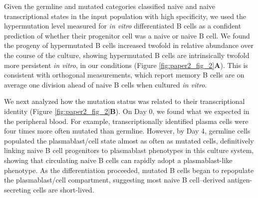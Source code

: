 Given the germline and mutated categories classified naive and naive transcriptional states in the input population with high specificity, we used the hypermutation level measured for \textit{in vitro} differentiated B cells as a confident prediction of whether their progenitor cell was a naive or naive B cell. We found the progeny of hypermutated B cells increased twofold in relative abundance over the course of the culture, showing hypermutated B cells are intrinsically twofold more persistent \textit{in vitro}, in our conditions (Figure \ref{fig:paper2_fig_2}\textbf{A}). This is consistent with orthogonal measurements, which report memory B cells are on average one division ahead of naive B cells when cultured \textit{in vitro}\cite{tangye_intrinsic_2003}.


We next analyzed how the mutation status was related to their transcriptional identity (Figure \ref{fig:paper2_fig_2}\textbf{B}). On Day 0, we found what we expected in the peripheral blood. For example, transcriptionally identified plasma cells were four times more often mutated than germline. However, by Day 4, germline cells populated the plasmablast/cell state almost as often as mutated cells, definitively linking naive B cell progenitors to plasmablast phenotypes in this culture system, showing that circulating naive B cells can rapidly adopt a plasmablast-like phenotype. As the differentiation proceeded, mutated B cells began to repopulate the plasmablast/cell compartment, suggesting most naive B cell–derived antigen-secreting cells are short-lived.
